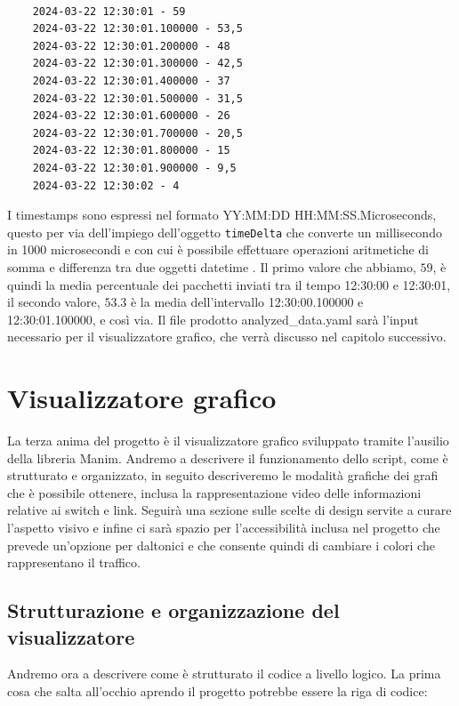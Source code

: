 \documentclass[binding=0.6cm]{sapthesis}
\begin{document}
{\scriptsize %
\begin{lstlisting}[caption={Timestamps e medie percentuali calcolate dall'analizzatore}, label={codice:analyzed_data_structure}]

    2024-03-22 12:30:01 - 59
    2024-03-22 12:30:01.100000 - 53,5
    2024-03-22 12:30:01.200000 - 48
    2024-03-22 12:30:01.300000 - 42,5
    2024-03-22 12:30:01.400000 - 37
    2024-03-22 12:30:01.500000 - 31,5
    2024-03-22 12:30:01.600000 - 26
    2024-03-22 12:30:01.700000 - 20,5
    2024-03-22 12:30:01.800000 - 15
    2024-03-22 12:30:01.900000 - 9,5
    2024-03-22 12:30:02 - 4

\end{lstlisting}
}
I timestamps sono espressi nel formato YY:MM:DD HH:MM:SS.Microseconds, questo per via dell'impiego dell'oggetto \texttt{timeDelta} \cite{pythonDatetimeTimedelta} che converte un millisecondo in 1000 microsecondi e con cui è possibile effettuare
operazioni aritmetiche di somma e differenza tra due oggetti datetime \cite{pythonDatetimeTimedelta}.
Il primo valore che abbiamo, \(59\), è quindi la media percentuale dei pacchetti inviati tra il tempo 12:30:00 e 12:30:01, il secondo valore, \(53.3\) è la media
dell'intervallo 12:30:00.100000 e 12:30:01.100000, e così via.
Il file prodotto analyzed\_data.yaml sarà l'input necessario per il visualizzatore grafico, che verrà discusso nel capitolo successivo.

\chapter{Visualizzatore grafico}
La terza anima del progetto è il visualizzatore grafico sviluppato tramite l'ausilio della libreria Manim. Andremo a descrivere il funzionamento dello script,
come è strutturato e organizzato, in seguito descriveremo le modalità grafiche dei grafi che è possibile ottenere, inclusa la rappresentazione video
delle informazioni relative ai switch e link. Seguirà una sezione sulle scelte di design servite a curare l'aspetto visivo e infine ci sarà spazio
per l'accessibilità inclusa nel progetto che prevede un'opzione per daltonici e che consente quindi di cambiare i colori che rappresentano il traffico.

\section{Strutturazione e organizzazione del visualizzatore}
\label{sec:strutturazione_visualizzatore}
Andremo ora a descrivere come è strutturato il codice a livello logico. La prima cosa che salta all'occhio aprendo il progetto potrebbe essere la riga di codice:
\end{document}
